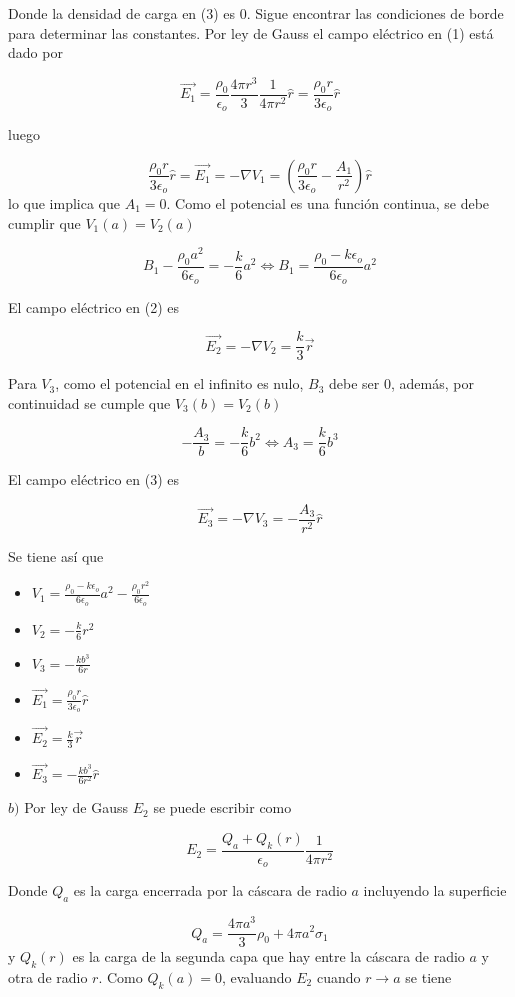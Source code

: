 Donde la densidad de carga en (3) es 0. Sigue encontrar las condiciones de borde para determinar las constantes.
\medbreak
Por ley de Gauss el campo eléctrico en (1) está dado por

\[\Vec{E_1} = \frac{\rho_0}{\epsilon_o}\frac{4\pi r^3}{3}
\frac{1}{4\pi r^2}\hat{r} = \frac{\rho_0r}{3\epsilon_o}\hat{r}\]

luego

\[\frac{\rho_0r}{3\epsilon_o}\hat{r} =
\Vec{E_1} = -\nabla V_1 = \left(
\frac{\rho_0r}{3\epsilon_o}-\frac{A_1}{r^2}
\right)\hat{r}\]
\bigbreak
lo que implica que $A_1 = 0$. Como el potencial es una función continua, se debe cumplir que $V_1(a) = V_2(a)$

\[B_1-\frac{\rho_0 a^2}{6\epsilon_o} = -\frac{k}{6}a^2
\Leftrightarrow
B_1= \frac{\rho_0-k\epsilon_o}{6\epsilon_o}a^2
\]

El campo eléctrico en (2) es

\[\Vec{E_2}=-\nabla V_2=\frac{k}{3}\Vec{r}\]

Para $V_3$, como el potencial en el infinito es nulo, $B_3$ debe ser 0, además, por continuidad se cumple que $V_3(b) = V_2(b)$

\[-\frac{A_3}{b} = -\frac{k}{6}b^2
\Leftrightarrow
A_3 = \frac{k}{6}b^3
\]

El campo eléctrico en (3) es

\[\Vec{E_3}=-\nabla V_3=-\frac{A_3}{r^2}\hat{r}\]

Se tiene así que

\begin{itemize}
    \item $V_1 = \frac{\rho_0-k\epsilon_o}{6\epsilon_o}a^2
    -\frac{\rho_0 r^2}{6\epsilon_o}$
    \item $V_2 = -\frac{k}{6}r^2$
    \item $V_3 = -\frac{kb^3}{6r}$
    \item $\Vec{E_1}=\frac{\rho_0 r}{3\epsilon_o}\hat{r}$
    \item $\Vec{E_2}=\frac{k}{3}\Vec{r}$
    \item $\Vec{E_3}=-\frac{kb^3}{6r^2}\hat{r}$
\end{itemize}
\bigbreak
$b)$ Por ley de Gauss $E_2$ se puede escribir como

\[E_2 = \frac{Q_a+Q_k(r)}{\epsilon_o}\frac{1}{4\pi r^2}\]

Donde $Q_a$ es la carga encerrada por la cáscara de radio $a$ incluyendo la superficie

\[Q_a = \frac{4\pi a^3}{3}\rho_0+4\pi a^2\sigma_1\]
\medbreak
y $Q_k(r)$ es la carga de la segunda capa que hay entre la cáscara de radio $a$ y otra de radio $r$. Como $Q_k(a)=0$, evaluando $E_2$ cuando $r\rightarrow a$ se tiene

